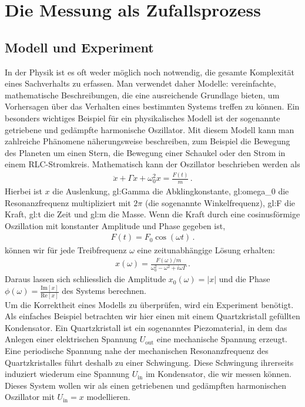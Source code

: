 \chapter{Die Messung als Zufallsprozess}
\label{chap:fehler}

\section{Modell und Experiment}
\label{chap:fehler:sec:modell}

In der Physik ist es oft weder möglich noch notwendig, die gesamte Komplexität eines Sachverhalts zu erfassen. Man verwendet daher Modelle: vereinfachte, mathematische Beschreibungen, die eine ausreichende Grundlage bieten, um  Vorhersagen über das Verhalten eines bestimmten Systems treffen zu können. Ein besonders wichtiges Beispiel für ein physikalisches Modell ist der sogenannte getriebene und gedämpfte harmonische Oszillator. Mit diesem Modell kann man zahlreiche Phänomene näherungsweise beschreiben, zum Beispiel die Bewegung des Planeten um einen Stern, die Bewegung einer Schaukel oder den Strom in einem RLC-Stromkreis. Mathematisch kann der Oszillator beschrieben  werden als 
\begin{align}
\ddot{x} + \Gamma \dot{x} + \omega_0^2 x = \frac{F ( t )}{m}\,.
\end{align}
Hierbei ist $x$ die Auslenkung, \gls{gl:Gamma} die Abklingkonstante, \gls{gl:omega_0} die Resonanzfrequenz multipliziert mit $2\pi$ (die sogenannte Winkelfrequenz), \gls{gl:F} die Kraft, \gls{gl:t} die Zeit und \gls{gl:m} die Masse. Wenn die Kraft durch eine cosinusförmige Oszillation mit konstanter Amplitude und Phase gegeben ist,
\begin{align}
F(t) = F_0 \cos(\omega t)\,.
\end{align}
können wir für jede Treibfrequenz $\omega$ eine zeitunabhängige Lösung erhalten:
\begin{align}
x(\omega) = \frac{F(\omega)/m}{\omega_0^2-\omega^2+i\omega\Gamma}\,.
\end{align}
Daraus lassen sich schliesslich die Amplitude $x_0(\omega) = \lvert x \rvert$ und die Phase $\phi(\omega) = \frac{\mathrm{Im}[x]}{\mathrm{Re}[x]}$ des Systems berechnen. \\

Um die Korrektheit eines Modells zu überprüfen, wird ein Experiment benötigt. Als einfaches Beispiel betrachten wir hier einen mit einem Quartzkristall gefüllten Kondensator. Ein Quartzkristall ist ein sogenanntes Piezomaterial, in dem das Anlegen einer elektrischen Spannung $U_{\mathrm{out}}$ eine mechanische Spannung erzeugt. Eine periodische Spannung nahe der mechanischen Resonanzfrequenz des Quartzkristalles führt deshalb zu einer Schwingung. Diese Schwingung ihrerseits induziert wiederum eine Spannung $U_{\mathrm{in}}$ im Kondensator, die wir messen können. Dieses System wollen wir als einen getriebenen und gedämpften harmonischen Oszillator mit $U_{\mathrm{in}} = x$ modellieren. \\

